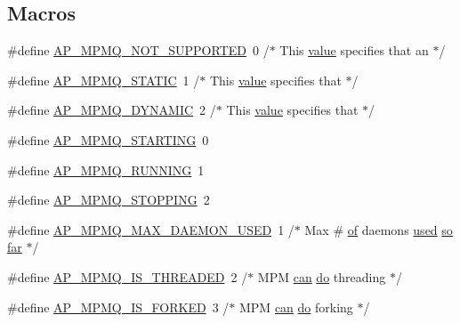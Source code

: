 \subsection*{Macros}
\begin{DoxyCompactItemize}
\item 
\#define \hyperlink{group__APACHE__CORE__MPM_ga09e191290b128888f08e0a2b27bd562d}{A\+P\+\_\+\+M\+P\+M\+Q\+\_\+\+N\+O\+T\+\_\+\+S\+U\+P\+P\+O\+R\+T\+ED}~0  /$\ast$ This \hyperlink{pcretest_8txt_a262ad32c75be9b93a7a77b045ed14fe0}{value} specifies that an $\ast$/
\item 
\#define \hyperlink{group__APACHE__CORE__MPM_ga0dd365b7207ddb5a38c3552c181eb448}{A\+P\+\_\+\+M\+P\+M\+Q\+\_\+\+S\+T\+A\+T\+IC}~1  /$\ast$ This \hyperlink{pcretest_8txt_a262ad32c75be9b93a7a77b045ed14fe0}{value} specifies that    $\ast$/
\item 
\#define \hyperlink{group__APACHE__CORE__MPM_ga07ae7f2935f87598d6e9ec3400e8fe65}{A\+P\+\_\+\+M\+P\+M\+Q\+\_\+\+D\+Y\+N\+A\+M\+IC}~2  /$\ast$ This \hyperlink{pcretest_8txt_a262ad32c75be9b93a7a77b045ed14fe0}{value} specifies that    $\ast$/
\item 
\#define \hyperlink{group__APACHE__CORE__MPM_ga4af674fa892df4c6d6b97be427a1a541}{A\+P\+\_\+\+M\+P\+M\+Q\+\_\+\+S\+T\+A\+R\+T\+I\+NG}~0
\item 
\#define \hyperlink{group__APACHE__CORE__MPM_gaed7524e8aed56492eb53b4959a02a08d}{A\+P\+\_\+\+M\+P\+M\+Q\+\_\+\+R\+U\+N\+N\+I\+NG}~1
\item 
\#define \hyperlink{group__APACHE__CORE__MPM_gafca606af8b4b151e421cd073c8467b5e}{A\+P\+\_\+\+M\+P\+M\+Q\+\_\+\+S\+T\+O\+P\+P\+I\+NG}~2
\item 
\#define \hyperlink{group__APACHE__CORE__MPM_ga3898aa97a0fff536aa7cca2cc1819439}{A\+P\+\_\+\+M\+P\+M\+Q\+\_\+\+M\+A\+X\+\_\+\+D\+A\+E\+M\+O\+N\+\_\+\+U\+S\+ED}~1  /$\ast$ Max \# \hyperlink{pcre_8txt_a9d5b55a535a7d176d14b62d664b47b4d}{of} daemons \hyperlink{pcregrep_8txt_ac199431a7baad211fadcdb6c45bfe7c0}{used} \hyperlink{pcretest_8txt_a35e1c9bd1e24f3f31253ab761f792055}{so} \hyperlink{apr__arch__pre__nw_8h_a0996c29b5fdd7baa181e30274b2378b7}{far} $\ast$/
\item 
\#define \hyperlink{group__APACHE__CORE__MPM_ga786edd9443a390943fd56b5b7721a05d}{A\+P\+\_\+\+M\+P\+M\+Q\+\_\+\+I\+S\+\_\+\+T\+H\+R\+E\+A\+D\+ED}~2  /$\ast$ M\+PM \hyperlink{pcre_8txt_a2a892895a50bc58f3679c7acb58190e6}{can} \hyperlink{pcregrep_8txt_a29df1716374a8e3439d34a27760970bd}{do} threading         $\ast$/
\item 
\#define \hyperlink{group__APACHE__CORE__MPM_ga186dc6000437c0a2408014ba23edae1e}{A\+P\+\_\+\+M\+P\+M\+Q\+\_\+\+I\+S\+\_\+\+F\+O\+R\+K\+ED}~3  /$\ast$ M\+PM \hyperlink{pcre_8txt_a2a892895a50bc58f3679c7acb58190e6}{can} \hyperlink{pcregrep_8txt_a29df1716374a8e3439d34a27760970bd}{do} forking           $\ast$/

\end{DoxyCompactItemize}
